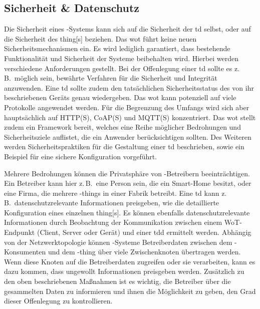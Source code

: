 \subsection{Sicherheit \& Datenschutz}\label{sec:wotsecurityprivacy}

Die Sicherheit eines -Systems kann sich auf die Sicherheit der \gls{td} selbst, oder auf die Sicherheit des \gls{thing}[s] beziehen.
Das \gls{wot} führt keine neuen Sicherheitsmechanismen ein. Es wird lediglich garantiert, dass bestehende Funktionalität und Sicherheit der Systeme beibehalten wird.
Hierbei werden verschiedene Anforderungen gestellt. Bei der Offenlegung einer \gls{td} sollte es z.\,B.\ möglich sein, bewährte Verfahren für die Sicherheit und Integrität anzuwenden.
Eine \gls{td} sollte zudem den tatsächlichen Sicherheitsstatus des von ihr beschriebenen Geräts genau wiedergeben.
Das \gls{wot} kann potenziell auf viele Protokolle angewendet werden. Für die Begrenzung des Umfangs wird sich aber hauptsächlich auf HTTP(S), CoAP(S) und MQTT(S) konzentriert.
Das \gls{wot} stellt zudem ein Framework bereit, welches eine Reihe möglicher Bedrohungen und Sicherheitsziele auflistet, die ein Anwender berücksichtigen sollten.
Des Weiteren werden Sicherheitspraktiken für die Gestaltung einer \gls{td} beschrieben, sowie ein Beispiel für eine sichere Konfiguration vorgeführt.

Mehrere Bedrohungen können die Privatsphäre von -Betreibern beeinträchtigen. Ein Betreiber kann hier z.\,B.\ eine Person sein, die ein Smart-Home besitzt,
oder eine Firma, die mehrere -\glspl{thing} in einer Fabrik betreibt.
Eine \gls{td} kann z.\,B.\ datenschutzrelevante Informationen preisgeben, wie die detaillierte Konfiguration eines einzelnen \gls{thing}[s].
Es können ebenfalls datenschutzrelevante Informationen durch Beobachtung der Kommunikation zwischen einem WoT-Endpunkt (Client, Server oder Gerät) und einer \gls{tdd} ermittelt werden.
Abhängig von der Netzwerktopologie können -Systeme Betreiberdaten zwischen dem -Konsumenten und dem -\gls{thing} über viele Zwischenknoten übertragen werden.
Wenn diese Knoten auf die Betreiberdaten zugreifen oder sie verarbeiten, kann es dazu kommen, dass ungewollt Informationen preisgeben werden.
Zusätzlich zu den oben beschriebenen Maßnahmen ist es wichtig, die Betreiber über die gesammelten Daten zu informieren und ihnen die Möglichkeit zu geben, den Grad dieser Offenlegung zu kontrollieren.
